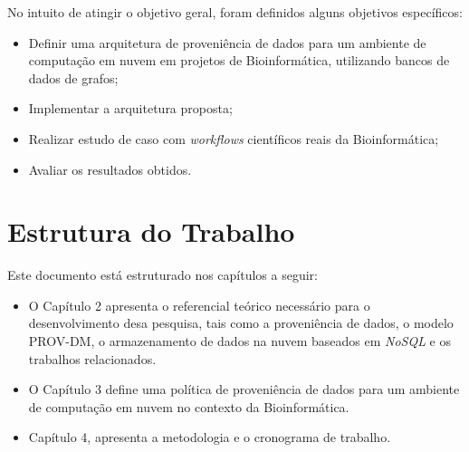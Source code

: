 No intuito de atingir o objetivo geral, foram definidos alguns objetivos específicos:

\begin{itemize}
\item Definir uma arquitetura de proveniência de dados para um ambiente de computação em nuvem em projetos de Bioinformática, utilizando bancos de dados de grafos;
\item Implementar a arquitetura proposta;
\item Realizar estudo de caso com \textit{workflows} científicos reais da Bioinformática;
\item Avaliar os resultados obtidos.
\end{itemize}


\section{Estrutura do Trabalho}

Este documento está estruturado nos capítulos a seguir:

\begin{itemize}
\item O Capítulo 2 apresenta o referencial teórico necessário para o desenvolvimento desa pesquisa, tais como a proveniência de dados, o modelo PROV-DM, o armazenamento de dados na nuvem baseados em \textit{NoSQL} e os trabalhos relacionados.
\item O Capítulo 3 define uma política de proveniência de dados para um ambiente de computação em nuvem no contexto da Bioinformática.
\item Capítulo 4, apresenta a metodologia e o cronograma de trabalho.
\end{itemize}
